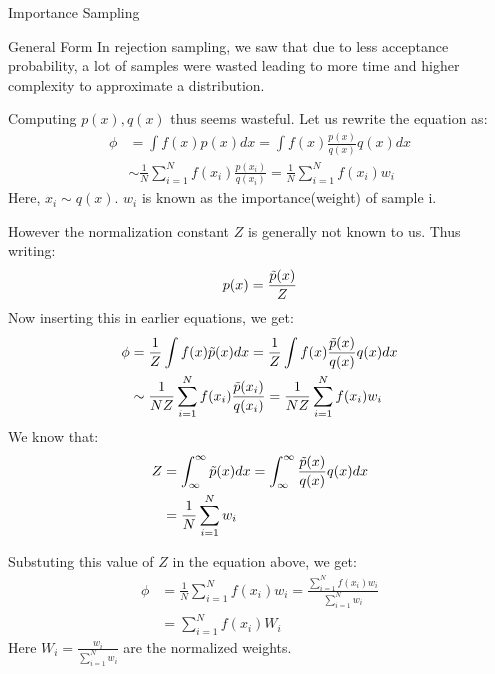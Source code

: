 \documentclass{beamer}
\begin{document}
\begin{section}{Importance Sampling}
    \begin{frame}{General Form}
        In rejection sampling, we saw that due to less acceptance probability, a lot of samples were wasted leading to more time and higher complexity to approximate a distribution.

        Computing $p(x), q(x)$ thus seems wasteful. Let us rewrite the equation as:
        \begin{align*}
            \phi &= \int f(x)p(x)dx = \int f(x)\frac{p(x)}{q(x)}q(x)dx \\
            &\sim \frac{1}{N} \sum_{i=1}^Nf(x_i)\frac{p(x_i)}{q(x_i)} = \frac{1}{N} \sum_{i=1}^Nf(x_i)w_i 
        \end{align*}
        Here, $x_i\sim q(x)$. $w_i$ is known as the importance(weight) of sample i. 
    \end{frame}

    \begin{frame}
        However the normalization constant $Z$ is generally not known to us. Thus writing: 
        \begin{equation}
            p(x) = \frac{\Tilde{p}(x)}{Z}
        \end{equation}
        Now inserting this in earlier equations, we get:
        \begin{align*}
            \phi &=\frac{1}{Z} \int f(x)\Tilde{p}(x)dx = \frac{1}{Z}\int f(x)\frac{\Tilde{p}(x)}{q(x)}q(x)dx \\
            &\sim \frac{1}{NZ} \sum_{i=1}^Nf(x_i)\frac{\Tilde{p}(x_i)}{q(x_i)} = \frac{1}{NZ} \sum_{i=1}^Nf(x_i)w_i 
        \end{align*}
        We know that:
        \begin{align*}
            Z &= \int_{\infty}^{\infty} \Tilde{p}(x)dx = \int_{\infty}^{\infty}\frac{\Tilde{p}(x)}{q(x)}q(x)dx \\
            &= \frac{1}{N}\sum_{i=1}^N w_i
        \end{align*}
    \end{frame}

    \begin{frame}
        Substuting this value of $Z$ in the equation above, we get:
        \begin{align*}
            \phi &= \frac{1}{N}\sum_{i=1}^N f(x_i)w_i = \frac{\sum_{i=1}^N f(x_i)w_i}{\sum_{i=1}^N w_i} \\
            &= \sum_{i=1}^N f(x_i)W_i
        \end{align*}
        Here $W_i = \frac{w_i}{\sum_{i=1}^N w_i}$ are the normalized weights.
    \end{frame}


\end{section}
\end{document}
